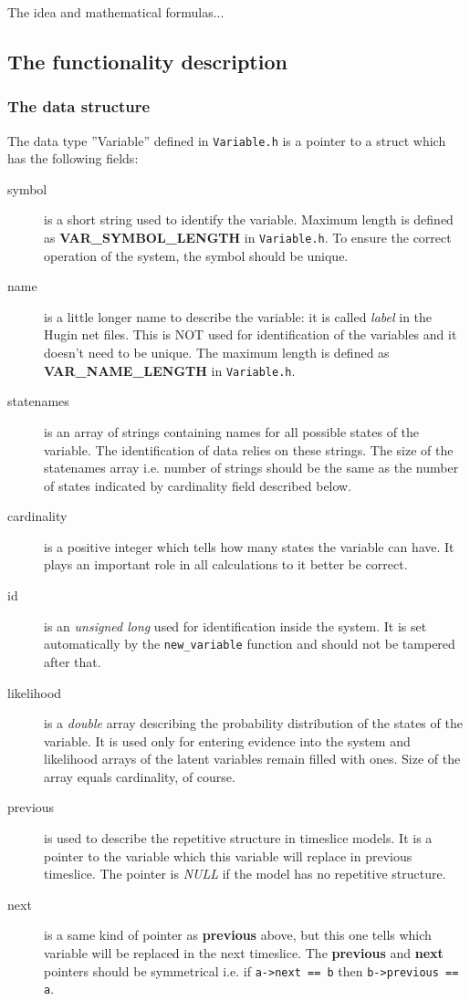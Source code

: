 \documentclass[12pt,a4paper]{report}
\begin{document}
The idea and mathematical formulas...

\subsection{The functionality description}

\subsubsection{The data structure}
The data type ''Variable'' defined in \verb+Variable.h+ is a pointer 
to a struct which has the following fields: 
\begin{description}
\item[symbol] is a short string used to identify the variable. Maximum
length is defined as \textbf{VAR\_SYMBOL\_LENGTH} in
\verb+Variable.h+. To ensure the correct operation of the system, the 
symbol should be unique.

\item[name] is a little longer name to describe the variable: it is
called {\it label} in the Hugin net files. This is NOT used for 
identification of the variables and it doesn't need to be unique. 
The maximum length is defined as \textbf{VAR\_NAME\_LENGTH} in 
\verb+Variable.h+.

\item[statenames] is an array of strings containing names for all
possible states of the variable. The identification of data relies on
these strings. The size of the statenames array i.e. number of
strings should be the same as the number of states indicated by
cardinality field described below.

\item[cardinality] is a positive integer which tells how many states
the variable can have. It plays an important role in all calculations
to it better be correct.

\item[id] is an {\it unsigned long} used for identification inside the
system. It is set automatically by the \verb+new_variable+ function
and should not be tampered after that.

\item[likelihood] is a {\it double} array describing the probability
distribution of the states of the variable. It is used only for
entering evidence into the system and likelihood arrays of the latent
variables remain filled with ones. Size of the array equals
cardinality, of course.

\item[previous] is used to describe the repetitive structure in
timeslice models. It is a pointer to the variable which this variable
will replace in previous timeslice. The pointer is {\it NULL} if the
model has no repetitive structure.

\item[next] is a same kind of pointer as \textbf{previous} above, but
this one tells which variable will be replaced in the next timeslice.
The \textbf{previous} and \textbf{next} pointers should be symmetrical
i.e. if \verb+a->next == b+ then \verb+b->previous == a+.
\end{description}
\end{document}
